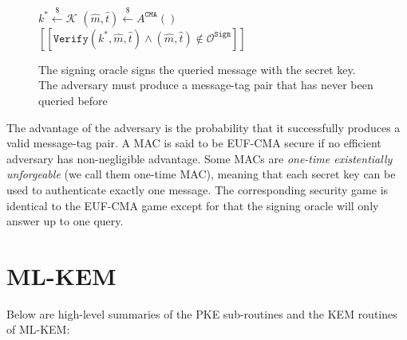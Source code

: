 \documentclass[letterpaper,12pt,titlepage,oneside,final]{book}
\newcommand{\sign}{\texttt{Sign}}
\newcommand{\verify}{\texttt{Verify}}
\newcommand{\leftsample}{\stackrel{\$}{\leftarrow}}
\newcommand{\llbrack}{[\![}
\newcommand{\rrbrack}{]\!]}
\begin{document}
\begin{figure}[htbp]
    \centering
    \begin{minipage}[t]{0.6\textwidth}
    \begin{algorithm}[H]
        \caption*{MAC EUF-CMA game}
        \begin{algorithmic}[1]
            \State $k^\ast \leftsample \mathcal{K}$
            \State $(\hat{m}, \hat{t}) \leftsample A^\texttt{CMA}()$
            \State \Return $\llbrack \verify(k^\ast, \hat{m}, \hat{t}) \land (\hat{m}, \hat{t}) \not\in \mathcal{O}^\sign \rrbrack$
        \end{algorithmic}
    \end{algorithm}
    \end{minipage}
    \caption{The signing oracle signs the queried message with the secret key. The adversary must produce a message-tag pair that has never been queried before}\label{fig:euf-cma-game}
\end{figure}

The advantage of the adversary is the probability that it successfully produces a valid message-tag pair. A MAC is said to be EUF-CMA secure if no efficient adversary has non-negligible advantage. Some MACs are \textit{one-time existentially unforgeable} (we call them one-time MAC), meaning that each secret key can be used to authenticate exactly one message. The corresponding security game is identical to the EUF-CMA game except for that the signing oracle will only answer up to one query.

\chapter{ML-KEM}\label{sec:review-ml-kem}
Below are high-level summaries of the PKE sub-routines and the KEM routines of ML-KEM:
\end{document}
